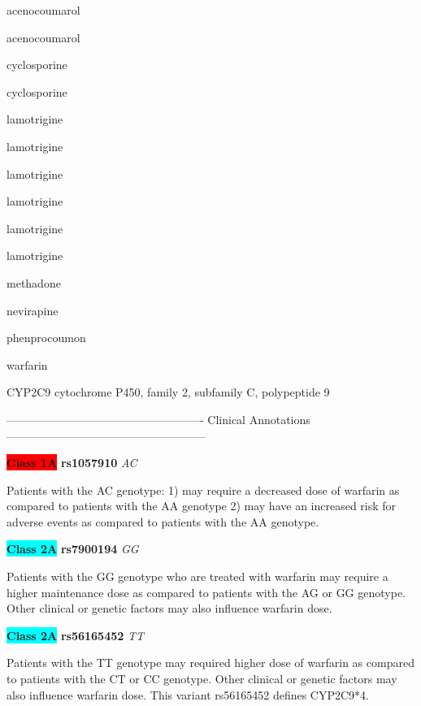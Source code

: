 \documentclass{resume} %
\begin{document}
\begin{rSection}{ acenocoumarol }
\begin{rSection}{ acenocoumarol }
\begin{rSection}{ cyclosporine }
\begin{rSection}{ cyclosporine }
\begin{rSection}{ lamotrigine }
\begin{rSection}{ lamotrigine }
\begin{rSection}{ lamotrigine }
\begin{rSection}{ lamotrigine }
\begin{rSection}{ lamotrigine }
\begin{rSection}{ lamotrigine }
\begin{rSection}{ methadone }
\begin{rSection}{ nevirapine }
\begin{rSection}{ phenprocoumon }
\begin{rSection}{ warfarin }
\begin{rSubsection}{ CYP2C9 }{ cytochrome P450, family 2, subfamily C, polypeptide 9 }{}{}
\item[] ---------------------------------------------------- Clinical Annotations -----------------------------------------------------\newline
\item \textbf{\colorbox{red} {Class 1A}} \textbf{ rs1057910 } \textit{ AC }
\item[] Patients with the AC genotype: 1) may require a decreased dose of warfarin as compared to patients with the AA genotype 2) may have an increased risk for adverse events as compared to patients with the AA genotype.\item \textbf{\colorbox{cyan} {Class 2A}} \textbf{ rs7900194 } \textit{ GG }
\item[] Patients with the GG genotype who are treated with warfarin may require a higher maintenance dose as compared to patients with the AG or GG genotype.  Other clinical or genetic factors may also influence warfarin dose.\item \textbf{\colorbox{cyan} {Class 2A}} \textbf{ rs56165452 } \textit{ TT }
\item[] Patients with the TT genotype may required higher dose of warfarin as compared to patients with the CT or CC genotype. Other clinical or genetic factors may also influence  warfarin dose. This variant rs56165452 defines CYP2C9*4.


\end{rSubsection}
\end{rSection}
\end{rSection}
\end{rSection}
\end{rSection}
\end{rSection}
\end{rSection}
\end{rSection}
\end{rSection}
\end{rSection}
\end{rSection}
\end{rSection}
\end{rSection}
\end{rSection}
\end{rSection}
\end{document}
